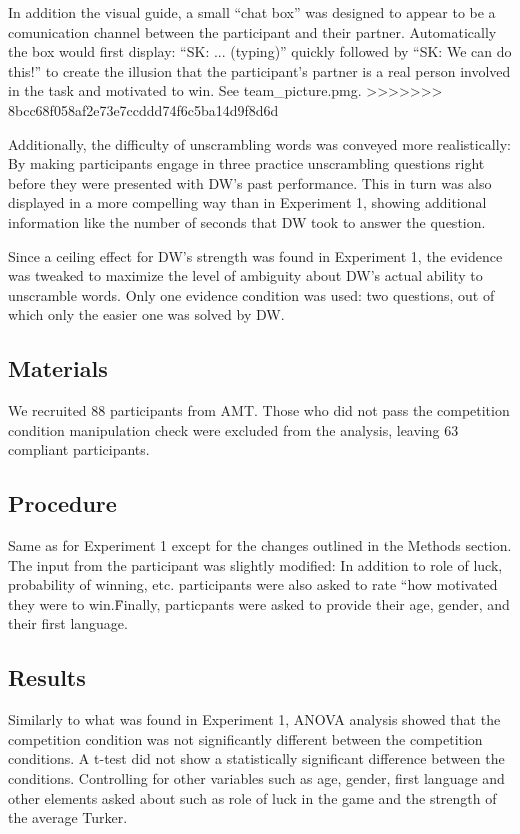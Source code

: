 \documentclass{article}
\begin{document}
In addition the visual guide, a small ``chat box'' was designed to appear to be a comunication channel between the participant and their partner. Automatically the box would first display: ``SK: ... (typing)'' quickly followed by ``SK: We can do this!'' to create the illusion that the participant's partner is a real person involved in the task and motivated to win. See team\_picture.pmg.
>>>>>>> 8bcc68f058af2e73e7ccddd74f6c5ba14d9f8d6d

Additionally, the difficulty of unscrambling words was conveyed more realistically: By making participants engage in three practice unscrambling questions right before they were presented with DW's past performance. This in turn was also displayed in a more compelling way than in Experiment 1, showing additional information like the number of seconds that DW took to answer the question.

Since a ceiling effect for DW's strength was found in Experiment 1, the evidence was tweaked to maximize the level of ambiguity about DW's actual ability to unscramble words. Only one evidence condition was used: two questions, out of which only the easier one was solved by DW.

\subsection{Materials}

We recruited 88 participants from AMT. Those who did not pass the competition condition manipulation check were excluded from the analysis, leaving 63 compliant participants.

\subsection{Procedure}

Same as for Experiment 1 except for the changes outlined in the Methods section. The input from the participant was slightly modified: In addition to role of luck, probability of winning, etc. participants were also asked to rate ``how motivated they were to win.\" Finally, particpants were asked to provide their age, gender, and their first language. 

\subsection{Results}


Similarly to what was found in Experiment 1, ANOVA analysis showed that the competition condition was not significantly different between the competition conditions. A t-test did not show a statistically significant difference between the conditions. Controlling for other variables such as age, gender, first language and other elements asked about such as role of luck in the game and the strength of the average Turker.
\end{document}
